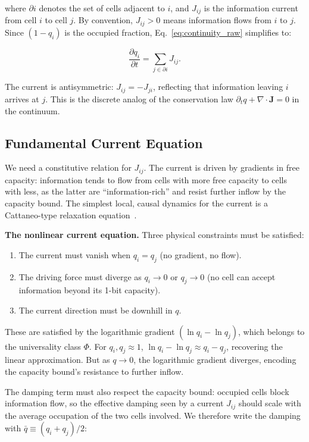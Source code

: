 \documentclass[aps,prd,twocolumn,showpacs,superscriptaddress,preprintnumbers]{revtex4-2}
\begin{document}
where $\partial i$ denotes the set of cells adjacent to $i$, and $J_{ij}$ is the information current from cell $i$ to cell $j$.
By convention, $J_{ij}>0$ means information flows from $i$ to $j$.
Since $(1-q_i)$ is the occupied fraction, Eq.~\eqref{eq:continuity_raw} simplifies to:

\begin{equation}
\boxed{\frac{\partial q_i}{\partial t} = \sum_{j \in \partial i} J_{ij}}.
\label{eq:continuity}
\end{equation}

The current is antisymmetric: $J_{ij}=-J_{ji}$, reflecting that information leaving $i$ arrives at $j$.
This is the discrete analog of the conservation law $\partial_t q + \nabla\cdot\mathbf{J}=0$ in the continuum.

\subsection{Fundamental Current Equation}

We need a constitutive relation for $J_{ij}$.
The current is driven by gradients in free capacity: information tends to flow from cells with more free capacity to cells with less, as the latter are ``information-rich'' and resist further inflow by the capacity bound.
The simplest local, causal dynamics for the current is a Cattaneo-type relaxation equation~\cite{Cattaneo:1948,Jou:2010}.

\textbf{The nonlinear current equation.}
Three physical constraints must be satisfied:
\begin{enumerate}
    \item The current must vanish when $q_i=q_j$ (no gradient, no flow).
    \item The driving force must diverge as $q_i\to0$ or $q_j\to0$ (no cell can accept information beyond its 1-bit capacity).
    \item The current direction must be downhill in $q$.
\end{enumerate}

These are satisfied by the logarithmic gradient $(\ln q_i-\ln q_j)$, which belongs to the universality class $\Phi$.
For $q_i,q_j\approx1$, $\ln q_i-\ln q_j\approx q_i-q_j$, recovering the linear approximation.
But as $q\to0$, the logarithmic gradient diverges, encoding the capacity bound's resistance to further inflow.

The damping term must also respect the capacity bound: occupied cells block information flow, so the effective damping seen by a current $J_{ij}$ should scale with the average occupation of the two cells involved.
We therefore write the damping with $\bar{q}\equiv(q_i+q_j)/2$:
\end{document}
